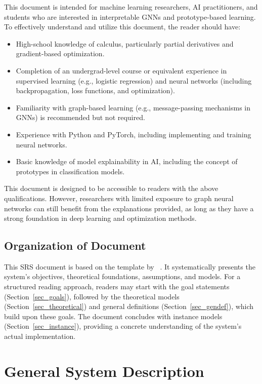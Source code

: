 \documentclass[12pt]{article}
\begin{document}
This document is intended for machine learning researchers, AI practitioners, and students who are interested in interpretable GNNs and prototype-based learning. To effectively understand and utilize this document, the reader should have:
\begin{itemize}
    \item High-school knowledge of calculus, particularly partial derivatives and gradient-based optimization.
    \item Completion of an undergrad-level course or equivalent experience in
supervised learning (e.g., logistic regression) and
neural networks (including backpropagation, loss functions, and optimization).
    \item Familiarity with graph-based learning (e.g., message-passing mechanisms in GNNs) is recommended but not required.
    \item Experience with Python and PyTorch, including implementing and training neural networks.
    \item Basic knowledge of model explainability in AI, including the concept of prototypes in classification models.
\end{itemize}

This document is designed to be accessible to readers with the above qualifications. However, researchers with limited exposure to graph neural networks can still benefit from the explanations provided, as long as they have a strong foundation in deep learning and optimization methods.

\subsection{Organization of Document}

This SRS document is based on the template by ~\citet{SmithAndLai2005, SmithEtAl2007}. It systematically presents the system's objectives, theoretical foundations, assumptions, and models. For a structured reading approach, readers may start with the goal statements (Section~\ref{sec_goals}), followed by the theoretical models (Section~\ref{sec_theoretical}) and general definitions (Section~\ref{sec_gendef}), which build upon these goals. The document concludes with instance models (Section~\ref{sec_instance}), providing a concrete understanding of the system’s actual implementation.

\section{General System Description}
\end{document}
